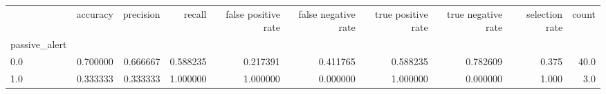\begin{tabular}{lrrrrrrrrr}
\toprule
{} &  accuracy &  precision &    recall &  false positive rate &  false negative rate &  true positive rate &  true negative rate &  selection rate &  count \\
passive\_alert &           &            &           &                      &                      &                     &                     &                 &        \\
\midrule
0.0           &  0.700000 &   0.666667 &  0.588235 &             0.217391 &             0.411765 &            0.588235 &            0.782609 &           0.375 &   40.0 \\
1.0           &  0.333333 &   0.333333 &  1.000000 &             1.000000 &             0.000000 &            1.000000 &            0.000000 &           1.000 &    3.0 \\
\bottomrule
\end{tabular}
